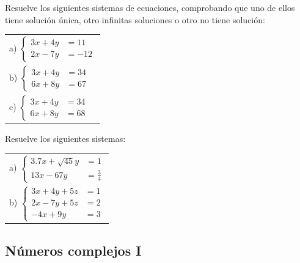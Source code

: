 \documentclass[12pt]{article}
\newenvironment{capitulo}{\begin{tcolorbox}[colback=blue!5!white,colframe=red!75!black]}{\end{tcolorbox}\bigskip}
\newenvironment{ejer}{\begin{tcolorbox}[center title, 
fonttitle=\sffamily\bfseries,colback=blue!5,colframe=orange]}{\end{tcolorbox}}
\begin{document}
\begin{ejer}

Resuelve los siguientes sistemas de ecuaciones, comprobando que uno de ellos tiene solución única, otro infinitas soluciones o otro no tiene solución:

\bigskip

\begin{tabular}{l }

\bigskip
a) $\begin{cases}
3x + 4y &=11\\
2x - 7y & = -12
\end{cases}$\\

\bigskip
b) $\begin{cases}
3x + 4y &=34\\
6x + 8y & = 67
\end{cases}$\\

\bigskip
c) $\begin{cases}
3x + 4y &=34\\
6x + 8y & = 68
\end{cases}$\\

\end{tabular}

\end{ejer}

\begin{ejer} 


Resuelve los siguientes sistemas:

\begin{tabular}{l }

\bigskip

a) $\begin{cases}
3.7x + \sqrt{45}y &=1\\
\displaystyle 13x-67y& = \frac{3}{4}
\end{cases}$\\



b) $\begin{cases}
3x + 4y +5z  &=1\\
2x - 7y  +5z & = 2\\
-4 x +9y & = 3
\end{cases}$
\end{tabular}

\end{ejer}

\newpage


\begin{capitulo}
\section*{Números complejos I}
\end{capitulo}
\end{document}

